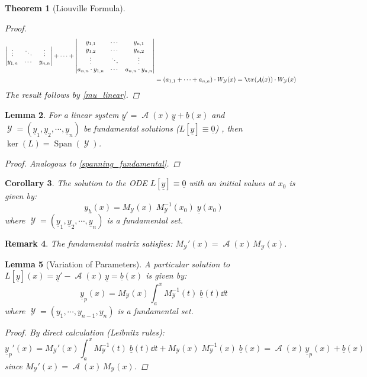 \documentclass[12pt]{article}
\DeclareMathOperator{\A}{\mathcal{A}}
\DeclareMathOperator{\Y}{\mathcal{Y}}
\newcommand{\tuple}[1]{\underline{#1}}
\newtheorem{theorem}{Theorem}[subsection]
\newtheorem{lemma}[theorem]{Lemma}
\newtheorem{corollary}[theorem]{Corollary}
\newtheorem{remark}[theorem]{Remark}
\begin{document}
\begin{theorem}[Liouville Formula]
\begin{proof}
\begin{align*}
\begin{vmatrix}
        \vdots&\ddots&\vdots\\
        y_{1,n}&\cdots&y_{n,n}
      \end{vmatrix}+\cdots+\begin{vmatrix}
        y_{1,1}&\cdots&y_{n,1}\\
        y_{1,2}&\cdots&y_{n,2}\\
        \vdots&\ddots&\vdots\\
        a_{n,n}\cdot y_{1,n}&\cdots&a_{n,n}\cdot y_{n,n}
      \end{vmatrix}\\
      &=(a_{1,1}+\cdots+ a_{n,n})\cdot W_{\Y}(x)=\tr(\A(x))\cdot W_{\Y}(x)
    \end{align*}
    The result follows by \ref{mu_linear}.
  \end{proof}
\end{theorem}

\begin{lemma}
  For a linear system $\tuple{y}'=\A(x)\,\tuple{y}+\tuple{b}(x)$ and $\Y=(\tuple{y}_1,\tuple{y}_2,\cdots,\tuple{y}_n)$ be fundamental solutions ($L[\tuple{y}]\equiv\tuple{0}$) , then $\ker(L)=\operatorname{Span}(\Y)$.
  \begin{proof}
    Analogous to \ref{spanning_fundamental}.
  \end{proof}
\end{lemma}

\begin{corollary}
  \label{initial_value}
  The solution to the ODE $L[\tuple{y}]\equiv \tuple{0}$ with an initial values at $x_0$ is given by:
  $$y_h(x)=M_{\Y}(x)\;M^{-1}_{\Y}(x_0)\;\tuple{y}(x_0)$$
  where $\Y=(\tuple{y}_1,\tuple{y}_2,\cdots,\tuple{y}_n)$ is a fundamental set.
\end{corollary}

\begin{remark}
  The fundamental matrix satisfies: $M_{\Y}'(x)=\A(x)\,M_{\Y}(x)$.
\end{remark}

\begin{lemma}[Variation of Parameters]
  A particular solution to $L[\tuple{y}](x)=\tuple{y}'-\A(x)\,\tuple{y}=\tuple{b}(x)$ is given by: $$\tuple{y}_p(x)=M_{\Y}(x)\int_a^x M_{\Y}^{-1}(t)\;\tuple{b}(t)\dd{t}$$
  where $\Y=(y_1,\cdots,y_{n-1},y_n)$ is a fundamental set.
  \begin{proof}
    By direct calculation (Leibnitz rules):
    $$\tuple{y}_p'(x)=M_{\Y}'(x)\int_a^x M_{\Y}^{-1}(t)\;\tuple{b}(t)\dd{t}+M_{\Y}(x)\; M_{\Y}^{-1}(x)\;\tuple{b}(x)=\A(x)\,\tuple{y}_p(x)+\tuple{b}(x)$$
    since $M_{\Y}'(x)=\A(x)\,M_{\Y}(x)$.
  \end{proof}
\end{lemma}
\end{document}
